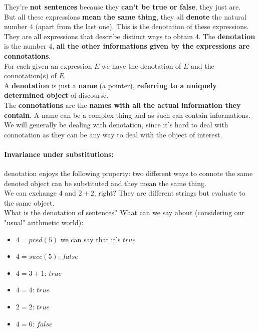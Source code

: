 \documentclass[11pt]{article}
\begin{document}
	They're \textbf{not sentences} because they \textbf{can't be true or false}, they just are. \\
	
	But all these expressions \textbf{mean the same thing}, they all \textbf{denote} the natural number $4$ (apart from the last one). This is the denotation of these expressions.\\
	
	They are all expressions that describe distinct ways to obtain $4$. The \textbf{denotation} is the number $4$, \textbf{all the other informations given by the expressions are connotations}.\\
	For each given an expression $E$ we have the denotation of $E$ and the connotation(s) of $E$.\\
	
	A \textbf{denotation} is just a \textbf{name} (a pointer), \textbf{referring to a uniquely determined object} of discourse.\\
	
	The \textbf{connotations} are the \textbf{names with all the actual information they contain}. A name can be a complex thing and as such can contain informations.\\
	
	We will generally be dealing with denotation, since it's hard to deal with connotation as they can be any way to deal with the object of interest.\\
	
	\newpage
	
	\paragraph{Invariance under substitutions:} denotation enjoys the following property: two different ways to connote the same denoted object can be substituted and they mean the same thing. \\
	
	We can exchange $4$ and $2+2$, right? They are different strings but evaluate to the same object.\\
	
	What is the denotation of sentences? What can we say about (considering our "usual" arithmetic world):
	\begin{itemize}
		\item $4 = pred(5)$ we can say that it's $true$
		\item $4 = succ(5)$: $false$
		\item $4  =3+1$: $true$
		\item $4 = 4$: $true$
		\item $2 = 2$: $true$
		\item $4 = 6$: $false$
	\end{itemize}
\end{document}
